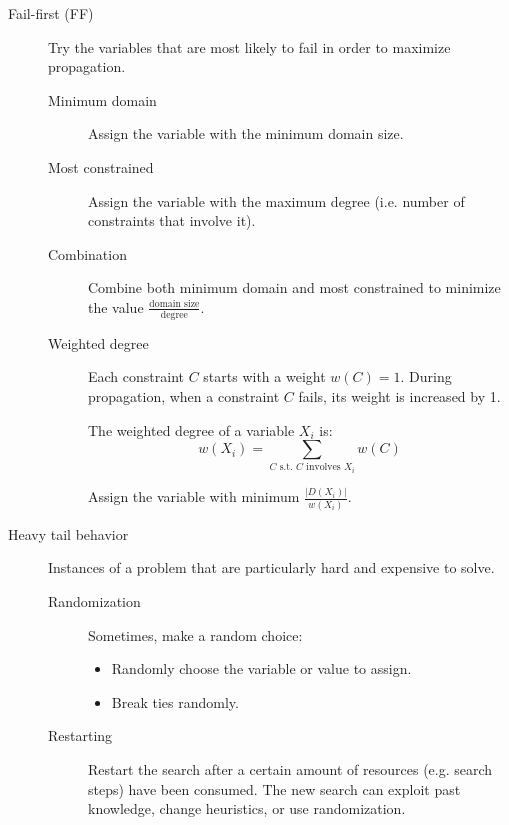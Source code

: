 \begin{description}
    \item[Fail-first (FF)] 
        Try the variables that are most likely to fail in order to maximize propagation.
        \begin{description}
            \item[Minimum domain] 
                Assign the variable with the minimum domain size.

            \item[Most constrained] 
                Assign the variable with the maximum degree (i.e. number of constraints that involve it).

            \item[Combination] 
                Combine both minimum domain and most constrained to minimize the value $\frac{\text{domain size}}{\text{degree}}$.
        
            \item[Weighted degree] 
                Each constraint $C$ starts with a weight $w(C) = 1$.
                During propagation, when a constraint $C$ fails, its weight is increased by 1.

                The weighted degree of a variable $X_i$ is:
                \[ w(X_i) = \sum_{\text{$C$ s.t. $C$ involves $X_i$}} w(C) \]

                Assign the variable with minimum $\frac{\vert D(X_i) \vert}{w(X_i)}$.
        \end{description}


    \item[Heavy tail behavior]
        Instances of a problem that are particularly hard and expensive to solve.

        \begin{description}
            \item[Randomization] 
                Sometimes, make a random choice:
                \begin{itemize}
                    \item Randomly choose the variable or value to assign.
                    \item Break ties randomly.
                \end{itemize}

            \item[Restarting] 
                Restart the search after a certain amount of resources (e.g. search steps) have been consumed.
                The new search can exploit past knowledge, change heuristics, or use randomization.


\end{description}
\end{description}
